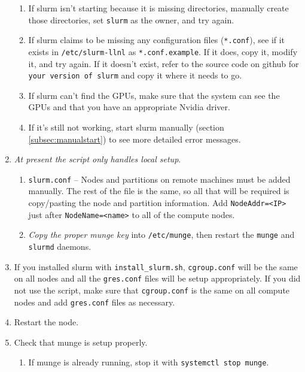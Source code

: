 \begin{enumerate}
\begin{enumerate}
	\item If slurm isn't starting because it is missing directories, manually create those directories, set \texttt{slurm} as the owner, and try again.

	\item If slurm claims to be missing any configuration files (\texttt{*.conf}), see if it exists in \texttt{/etc/slurm-llnl} as \texttt{*.conf.example}. If it does, copy it, modify it, and try again. If it doesn't exist, refer to the source code on github for \texttt{your version of slurm} and copy it where it needs to go.

	\item If slurm can't find the GPUs, make sure that the system can see the GPUs and that you have an appropriate Nvidia driver.

	\item If it's still not working, start slurm manually (section \ref{subsec:manualstart}) to see more detailed error messages. 
	\end{enumerate}

\item \emph{At present the script only handles local setup}. 

	\begin{enumerate}
	\item \texttt{slurm.conf} -- Nodes and partitions on remote machines must be added manually. The rest of the file is the same, so all that will be required is copy/pasting the node and partition information. Add \texttt{NodeAddr=<IP>} just after \texttt{NodeName=<name>} to all of the compute nodes.

	\item \emph{Copy the proper munge key} into \texttt{/etc/munge}, then restart the \texttt{munge} and \texttt{slurmd} daemons.
	\end{enumerate}

\item If you installed slurm with \texttt{install\_slurm.sh}, \texttt{cgroup.conf} will be the same on all nodes and all the \texttt{gres.conf} files will be setup appropriately. If you did not use the script, make sure that \texttt{cgroup.conf} is the same on all compute nodes and add \texttt{gres.conf} files as necessary.

\item Restart the node.

\item Check that munge is setup properly. \label{list:munge}
	\begin{enumerate}
	\item If munge is already running, stop it with \texttt{systemctl stop munge}.


\end{enumerate}
\end{enumerate}
